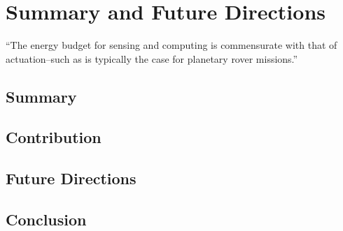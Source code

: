
\chapter{\color{red}Summary and Future Directions}
\label{cp:conc}

\begin{chapquote}{\cite{ondruska2015scheduled}}
  ``The energy budget for sensing and computing is commensurate with  that of actuation--such as is typically the case for planetary rover missions.''
\end{chapquote}
  
\vspace*{1em}


\section{\color{red}Summary}


\section{\color{red}Contribution}


\section{\color{red}Future Directions}


\section{\color{red}Conclusion}

